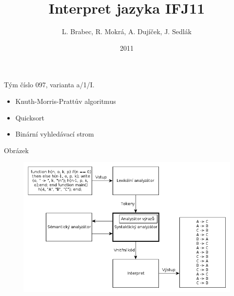 \documentclass{beamer}
\title[Interpret jazyka IFJ11]{Interpret jazyka IFJ11}
\institute{FIT VUT Brno}
\author{~~L. Brabec, R. Mokrá, A. Dujíček, J. Sedlák~~\\}
\date{2011}
\begin{document}
\begin{frame}
  \maketitle
\end{frame}

\begin{frame}
  Tým číslo 097, varianta a/1/I.
  \begin{itemize}
  \item Knuth-Morris-Prattův algoritmus
  \item Quicksort
  \item Binární vyhledávací strom
  \end{itemize}
\end{frame}

\begin{frame}{Obrázek}
  \begin{figure}
    \includegraphics[scale=0.45]{schema.png}
  \end{figure}
\end{frame}
\end{document}
